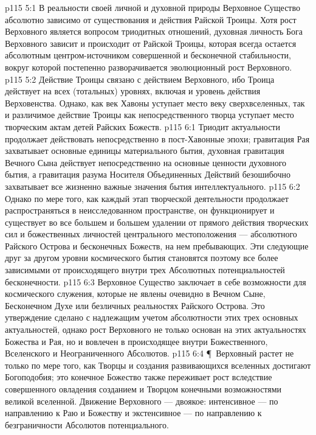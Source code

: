 \vs p115 5:1 В реальности своей личной и духовной природы Верховное Существо абсолютно зависимо от существования и действия Райской Троицы. Хотя рост Верховного является вопросом триодитных отношений, духовная личность Бога Верховного зависит и происходит от Райской Троицы, которая всегда остается абсолютным центром\hyp{}источником совершенной и бесконечной стабильности, вокруг которой постепенно разворачивается эволюционный рост Верховного.
\vs p115 5:2 Действие Троицы связано с действием Верховного, ибо Троица действует на всех (тотальных) уровнях, включая и уровень действия Верховенства. Однако, как век Хавоны уступает место веку сверхвселенных, так и различимое действие Троицы как непосредственного творца уступает место творческим актам детей Райских Божеств.
\vs p115 6:1 Триодит актуальности продолжает действовать непосредственно в пост\hyp{}Хавонные эпохи; гравитация Рая захватывает основные единицы материального бытия, духовная гравитация Вечного Сына действует непосредственно на основные ценности духовного бытия, а гравитация разума Носителя Объединенных Действий безошибочно захватывает все жизненно важные значения бытия интеллектуального.
\vs p115 6:2 Однако по мере того, как каждый этап творческой деятельности продолжает распространяться в неисследованном пространстве, он функционирует и существует во все большем и большем удалении от прямого действия творческих сил и божественных личностей центрального местоположения --- абсолютного Райского Острова и бесконечных Божеств, на нем пребывающих. Эти следующие друг за другом уровни космического бытия становятся поэтому все более зависимыми от происходящего внутри трех Абсолютных потенциальностей бесконечности.
\vs p115 6:3 Верховное Существо заключает в себе возможности для космического служения, которые не явлены очевидно в Вечном Сыне, Бесконечном Духе или безличных реальностях Райского Острова. Это утверждение сделано с надлежащим учетом абсолютности этих трех основных актуальностей, однако рост Верховного не только основан на этих актуальностях Божества и Рая, но и вовлечен в происходящее внутри Божественного, Вселенского и Неограниченного Абсолютов.
\vs p115 6:4 \P\ Верховный растет не только по мере того, как Творцы и создания развивающихся вселенных достигают Богоподобия; это конечное Божество также переживает рост вследствие совершенного овладения созданием и Творцом конечными возможностями великой вселенной. Движение Верховного --- двоякое: интенсивное --- по направлению к Раю и Божеству и экстенсивное --- по направлению к безграничности Абсолютов потенциального.
